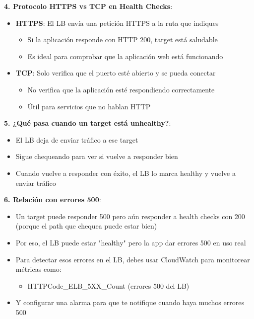 \documentclass[12pt,a4paper]{report}
\begin{document}
\textbf{4. Protocolo HTTPS vs TCP en Health Checks}:
\begin{itemize}
    \item \textbf{HTTPS}: El LB envía una petición HTTPS a la ruta que indiques
    \begin{itemize}
        \item Si la aplicación responde con HTTP 200, target está saludable
        \item Es ideal para comprobar que la aplicación web está funcionando
    \end{itemize}
    \item \textbf{TCP}: Solo verifica que el puerto esté abierto y se pueda conectar
    \begin{itemize}
        \item No verifica que la aplicación esté respondiendo correctamente
        \item Útil para servicios que no hablan HTTP
    \end{itemize}
\end{itemize}

\textbf{5. ¿Qué pasa cuando un target está unhealthy?}:
\begin{itemize}
    \item El LB deja de enviar tráfico a ese target
    \item Sigue chequeando para ver si vuelve a responder bien
    \item Cuando vuelve a responder con éxito, el LB lo marca healthy y vuelve a enviar tráfico
\end{itemize}

\textbf{6. Relación con errores 500}:
\begin{itemize}
    \item Un target puede responder 500 pero aún responder a health checks con 200 (porque el path que chequea puede estar bien)
    \item Por eso, el LB puede estar "healthy" pero la app dar errores 500 en uso real
    \item Para detectar esos errores en el LB, debes usar CloudWatch para monitorear métricas como:
    \begin{itemize}
        \item HTTPCode\_ELB\_5XX\_Count (errores 500 del LB)
    \end{itemize}
    \item Y configurar una alarma para que te notifique cuando haya muchos errores 500
\end{itemize}
\end{document}
